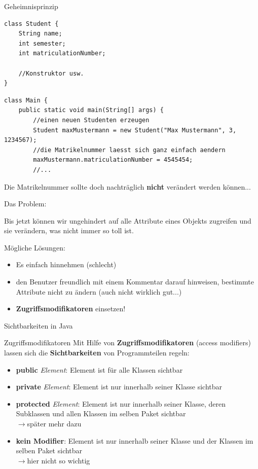 \documentclass[18pt]{beamer}
\begin{document}
\begin{frame}[containsverbatim]{Geheimnisprinzip}
\begin{lstlisting}
class Student {
	String name;
	int semester;
	int matriculationNumber;
	
	//Konstruktor usw.
}
\end{lstlisting}
\begin{lstlisting}
class Main {
	public static void main(String[] args) {
		//einen neuen Studenten erzeugen
		Student maxMustermann = new Student("Max Mustermann", 3, 1234567);
		//die Matrikelnummer laesst sich ganz einfach aendern
		maxMustermann.matriculationNumber = 4545454;
		//...
\end{lstlisting}
Die Matrikelnummer sollte doch nachträglich \textbf{nicht} verändert werden können...
\end{frame}

\begin{frame}{Das Problem:}
\begin{alertblock}{}
Bis jetzt können wir ungehindert auf alle Attribute eines Objekts zugreifen und sie verändern, was nicht immer so toll ist.
\end{alertblock}

\pause
\begin{block}{Mögliche Lösungen:}
\begin{itemize}
	\item Es einfach hinnehmen \pause (schlecht)
	\pause
	\item den Benutzer freundlich mit einem Kommentar darauf hinweisen, bestimmte Attribute nicht zu ändern
	\pause (auch nicht wirklich gut...)
	\pause
	\item \textbf{Zugriffsmodifikatoren} einsetzen!
\end{itemize}
\end{block}
\end{frame}

\begin{frame}{Sichtbarkeiten in Java}
\begin{block}{Zugriffsmodifikatoren}
Mit Hilfe von \textbf{Zugriffsmodifikatoren} (access modifiers) lassen sich die \textbf{Sichtbarkeiten} von Programmteilen regeln:
\begin{itemize}
	\item \textbf{public} \textit{Element}: Element ist für alle Klassen sichtbar
	\item \textbf{private} \textit{Element}: Element ist nur innerhalb seiner Klasse sichtbar
	\pause
	\item  \textbf{protected} \textit{Element}: Element ist nur innerhalb seiner Klasse, deren Subklassen und allen Klassen im selben Paket sichtbar\\
	$\rightarrow$später mehr dazu
	\item \textbf{kein Modifier}: Element ist nur innerhalb seiner Klasse und der Klassen im selben Paket sichtbar\\
	$\rightarrow$hier nicht so wichtig
\end{itemize}
\end{block}
\end{frame}
\end{document}
